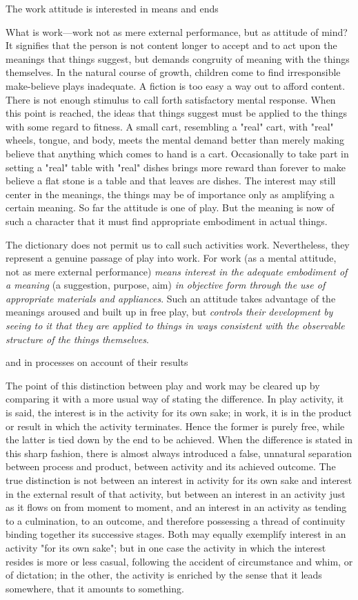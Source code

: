\documentclass[letterpaper]{book}
\begin{document}
The work attitude is interested in means and ends

What is work---work not as mere external
performance,
but as attitude of mind? It signifies that the person is not content
longer to accept and to act upon the meanings that things suggest, but
demands congruity of meaning with the things themselves. In the natural
course of growth, children come to find irresponsible make-believe plays
inadequate. A fiction is too easy a way out to afford content. There is
not enough stimulus to call forth satisfactory mental response. When
this point is reached, the ideas that things suggest must be applied to
the things with some regard to fitness. A small cart, resembling a
"real" cart, with "real" wheels, tongue, and body, meets the mental
demand better than merely making believe that anything which comes to
hand is a cart. Occasionally to take part in setting a "real" table with
"real" dishes brings more reward than forever to make believe a flat
stone is a table and that leaves are dishes. The interest may still
center in the meanings, the things may be of importance only as
amplifying a certain meaning. So far the attitude is one of play. But
the meaning is now of such a character that it must find appropriate
embodiment in actual things.

The dictionary does not permit us to call such activities work.
Nevertheless, they represent a genuine passage of play into work. For
work (as a mental attitude, not as mere external performance)
\emph{means interest in the adequate embodiment of a meaning} (a
suggestion, purpose, aim) \emph{in objective form through the use of
appropriate materials and appliances}. Such an attitude takes advantage
of the meanings aroused and built up in free play, but \emph{controls
their development by seeing to it that they are applied to things in
ways consistent with the observable structure of the things
themselves}.

and in processes on account of their results

The point of this distinction between play and work may be cleared up by
comparing it with a more usual way of stating the difference. In play
activity, it is said, the interest is in the activity for its own sake;
in work, it is in the product or result in which the activity
terminates. Hence the former is purely free, while the latter is tied
down by the end to be achieved. When the difference is stated in this
sharp fashion, there is almost always introduced a false, unnatural
separation between process and product, between activity and its
achieved outcome. The true distinction is not between an interest in
activity for its own sake and interest in the external result of that
activity, but between an interest in an activity just as it flows on
from moment to moment, and an interest in an activity as tending to a
culmination, to an outcome, and therefore possessing a thread of
continuity binding together its successive stages. Both may equally
exemplify interest in an activity "for its own sake"; but in one case
the activity in which the interest resides is more or less casual,
following the accident of circumstance and whim, or of dictation; in the
other, the activity is enriched by the sense that it leads somewhere,
that it amounts to something.
\end{document}
